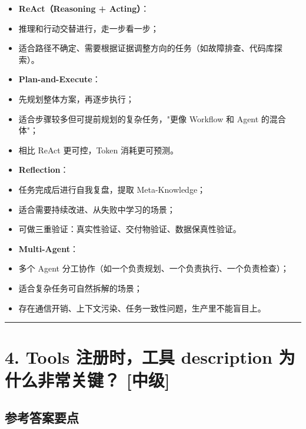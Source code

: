 \documentclass[9pt,a4paper,twocolumn]{ctexart}
\newcommand{\lvzhong}{\usebox{\badgezhongbox}}
\def\lvzhong{[中级]}%
\begin{document}
\begin{itemize}[itemsep=1pt, topsep=2pt]
  \item \textbf{ReAct（Reasoning + Acting）}：
  \item 推理和行动交替进行，走一步看一步；
  \item 适合路径不确定、需要根据证据调整方向的任务（如故障排查、代码库探索）。
  \item \textbf{Plan-and-Execute}：
  \item 先规划整体方案，再逐步执行；
  \item 适合步骤较多但可提前规划的复杂任务，"更像 Workflow 和 Agent 的混合体"；
  \item 相比 ReAct 更可控，Token 消耗更可预测。
  \item \textbf{Reflection}：
  \item 任务完成后进行自我复盘，提取 Meta-Knowledge；
  \item 适合需要持续改进、从失败中学习的场景；
  \item 可做三重验证：真实性验证、交付物验证、数据保真性验证。
  \item \textbf{Multi-Agent}：
  \item 多个 Agent 分工协作（如一个负责规划、一个负责执行、一个负责检查）；
  \item 适合复杂任务可自然拆解的场景；
  \item 存在通信开销、上下文污染、任务一致性问题，生产里不能盲目上。
\end{itemize}


\vspace{2pt}
\noindent\rule{\columnwidth}{0.3pt}\vspace{2pt}



\section*{4. Tools 注册时，工具 description 为什么非常关键？ \lvzhong{}}


\subsection*{参考答案要点}
\end{document}
